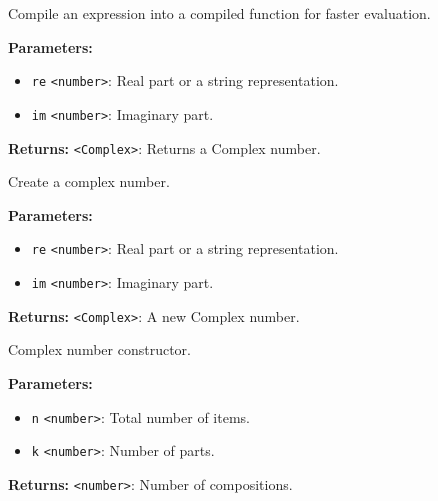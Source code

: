 \documentclass[12pt,a4paper]{article}
\begin{document}
\noindent Compile an expression into a compiled function for faster evaluation.

\vspace{5mm}
\noindent {}


\noindent \textbf{Parameters:}
\begin{itemize}
  \item \texttt{re} \texttt{<number>}: Real part or a string representation.
  \item \texttt{im} \texttt{<number>}: Imaginary part.
\end{itemize}

\noindent \textbf{Returns:} \texttt{<Complex>}: Returns a Complex number.

\noindent Create a complex number.

\vspace{5mm}
\noindent {}


\noindent \textbf{Parameters:}
\begin{itemize}
  \item \texttt{re} \texttt{<number>}: Real part or a string representation.
  \item \texttt{im} \texttt{<number>}: Imaginary part.
\end{itemize}

\noindent \textbf{Returns:} \texttt{<Complex>}: A new Complex number.

\noindent Complex number constructor.

\vspace{5mm}
\noindent {}


\noindent \textbf{Parameters:}
\begin{itemize}
  \item \texttt{n} \texttt{<number>}: Total number of items.
  \item \texttt{k} \texttt{<number>}: Number of parts.
\end{itemize}

\noindent \textbf{Returns:} \texttt{<number>}: Number of compositions.
\end{document}
